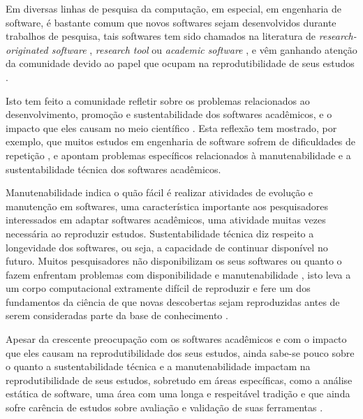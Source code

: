 
Em diversas linhas de pesquisa da computação, em especial, em engenharia de
software, é bastante comum que novos softwares sejam desenvolvidos durante
trabalhos de pesquisa, tais softwares tem sido chamados na literatura de {\it
research-originated software} \cite{Kon2011}, {\it research tool}
\cite{Portillo12} ou {\it academic software} \cite{allen2017engineering}, e vêm
ganhando atenção da comunidade devido ao papel que ocupam na reprodutibilidade
de seus estudos \cite{Peng2011}.

Isto tem feito a comunidade refletir sobre os problemas relacionados ao
desenvolvimento, promoção e sustentabilidade dos softwares acadêmicos, e o
impacto que eles causam no meio científico \cite{allen2017engineering}. Esta
reflexão tem mostrado, por exemplo, que muitos estudos em engenharia de
software sofrem de dificuldades de repetição \cite{Tang2016}, e apontam
problemas específicos relacionados à manutenabilidade e a sustentabilidade técnica
dos softwares acadêmicos.

Manutenabilidade indica o quão fácil é realizar atividades de evolução e
manutenção em softwares, uma característica importante aos pesquisadores
interessados em adaptar softwares acadêmicos, uma atividade muitas vezes
necessária ao reproduzir estudos. Sustentabilidade técnica diz respeito a
longevidade dos softwares, ou seja, a capacidade de continuar disponível
no futuro.  Muitos pesquisadores não disponibilizam os seus softwares
\cite{robles2010replicating, amann2015software} ou quanto o fazem enfrentam
problemas com disponibilidade e manutenabilidade \cite{Prlic2012}, isto leva a
um corpo computacional extramente difícil de reproduzir e fere um dos
fundamentos da ciência de que novas descobertas sejam reproduzidas antes de
serem consideradas parte da base de conhecimento \cite{Stodden2009}.

Apesar da crescente preocupação com os softwares acadêmicos e com o impacto que
eles causam na reprodutibilidade dos seus estudos, ainda sabe-se pouco sobre o
quanto a sustentabilidade técnica e a manutenabilidade impactam na
reprodutibilidade de seus estudos, sobretudo em áreas específicas, como a
análise estática de software, uma área com uma longa e respeitável tradição e
que ainda sofre carência de estudos sobre avaliação e validação de suas
ferramentas \cite{Li2010, ilyas2016static}.

